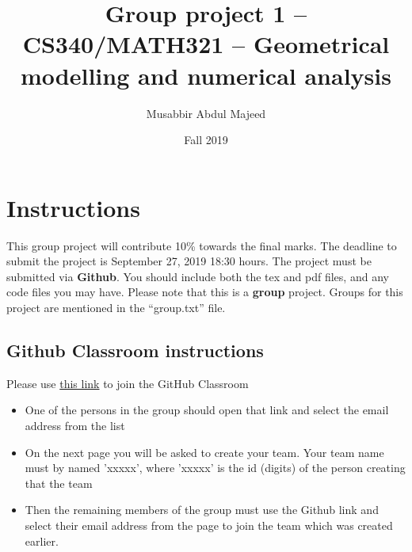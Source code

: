 \documentclass[a4paper, 11pt]{article}
\title{Group project 1 -- CS340/MATH321 -- Geometrical modelling and numerical analysis}
\date{Fall 2019}
\author{Musabbir Abdul Majeed}
\begin{document}
\maketitle  
\setlength{\parskip}{10pt}
\setlength{\parindent}{0pt}

\section*{Instructions}
This group project will contribute 10\% towards the final marks. The deadline to submit the project is September 27, 2019 18:30 hours. The project must be submitted via \textbf{Github}. You should include both the tex and pdf files, and any code files you may have. Please note that this is a \textbf{group} project. Groups for this project are mentioned in the ``group.txt'' file.

\subsection{Github Classroom instructions}
Please use \href{https://classroom.github.com/g/72yl9NvU}{this link} to join the GitHub Classroom
\begin{itemize}
    \item One of the persons in the group should open that link and select the email address from the list 
    \item On the next page you will be asked to create your team. Your team name must by named 'xxxxx', where 'xxxxx' is the id (digits) of the person creating that the team
    \item Then the remaining members of the group must use the Github link and select their email address from the page to join the team which was created earlier.
\end{itemize}
\end{document}
